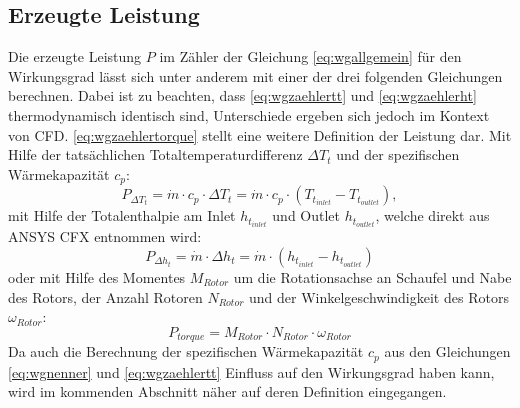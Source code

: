 \subsection{Erzeugte Leistung}
\label{sec:wirkungsgrade}
Die erzeugte Leistung $P$ im Zähler der Gleichung \ref{eq:wgallgemein} für den Wirkungsgrad  lässt sich unter anderem mit einer der drei folgenden Gleichungen berechnen. Dabei ist zu beachten, dass \ref{eq:wgzaehlertt} und \ref{eq:wgzaehlerht} thermodynamisch identisch sind, Unterschiede ergeben sich jedoch im Kontext von CFD. \ref{eq:wgzaehlertorque} stellt eine weitere Definition der Leistung dar.   \newline
Mit Hilfe der tatsächlichen Totaltemperaturdifferenz $\Delta T_t$ und der spezifischen Wärmekapazität $c_p$:
\begin{equation}
\label{eq:wgzaehlertt}
P_{\Delta T_t} = \dot m \cdot c_p \cdot \Delta T_t = \dot m \cdot c_p \cdot \left( T_{t_{inlet}}-T_{t_{outlet}} \right),
\end{equation}
mit Hilfe der Totalenthalpie am Inlet $h_{t_{inlet}}$ und Outlet $h_{t_{outlet}}$, welche direkt aus ANSYS CFX entnommen wird:
\begin{equation}
\label{eq:wgzaehlerht}
P_{\Delta h_t} = \dot m \cdot \Delta h_t = \dot m \cdot \left( h_{t_{inlet}}-h_{t_{outlet}} \right)
\end{equation}
oder mit Hilfe des Momentes $M_{Rotor}$ um die Rotationsachse an Schaufel und Nabe des Rotors, der Anzahl Rotoren $N_{Rotor}$ und der Winkelgeschwindigkeit des Rotors $\omega_{Rotor}$:
\begin{equation}
\label{eq:wgzaehlertorque}
P_{torque} = M_{Rotor} \cdot N_{Rotor} \cdot \omega_{Rotor}
\end{equation}
Da auch die Berechnung der spezifischen Wärmekapazität $c_p$ aus den Gleichungen \ref{eq:wgnenner} und \ref{eq:wgzaehlertt} Einfluss auf den Wirkungsgrad haben kann, wird im kommenden Abschnitt näher auf deren Definition eingegangen.


